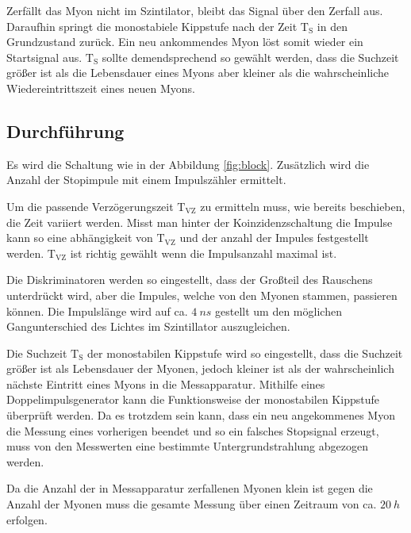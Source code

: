 Zerfällt das Myon nicht im Szintilator, bleibt das Signal über den Zerfall aus.
Daraufhin springt die monostabiele Kippstufe nach der Zeit $\text{T}_{\text{S}}$ in den Grundzustand zurück.
Ein neu ankommendes Myon löst somit wieder ein Startsignal aus.
$\text{T}_{\text{S}}$ sollte demendsprechend so gewählt werden, dass die Suchzeit größer ist als die Lebensdauer eines Myons
aber kleiner als die wahrscheinliche Wiedereintrittszeit eines neuen Myons.

\subsection{Durchführung}
Es wird die Schaltung wie in der Abbildung \ref{fig:block}.
Zusätzlich wird die Anzahl der Stopimpule mit einem Impulszähler ermittelt.

Um die passende Verzögerungszeit $\text{T}_{\text{VZ}}$ zu ermitteln muss, wie bereits beschieben, die Zeit variiert werden.
Misst man hinter der Koinzidenzschaltung die Impulse kann so eine abhängigkeit von $\text{T}_{\text{VZ}}$ und der anzahl der Impules festgestellt werden.
$\text{T}_{\text{VZ}}$ ist richtig gewählt wenn die Impulsanzahl maximal ist.

Die Diskriminatoren werden so eingestellt, dass der Großteil des Rauschens unterdrückt wird, aber die Impules, welche von den Myonen stammen, passieren können.
Die Impulslänge wird auf ca. $\SI{4}{ns}$ gestellt um den möglichen Gangunterschied des Lichtes im Szintillator auszugleichen.

Die Suchzeit $\text{T}_{\text{S}}$ der monostabilen Kippstufe wird so eingestellt, dass die Suchzeit größer ist als Lebensdauer der Myonen, jedoch kleiner ist als
der wahrscheinlich nächste Eintritt eines Myons in die Messapparatur.
Mithilfe eines Doppelimpulsgenerator kann die Funktionsweise der monostabilen Kippstufe überprüft werden.
Da es trotzdem sein kann, dass ein neu angekommenes Myon die Messung eines vorherigen beendet und so ein falsches Stopsignal erzeugt, muss von den Messwerten eine bestimmte Untergrundstrahlung abgezogen werden.

Da die Anzahl der in Messapparatur zerfallenen Myonen klein ist gegen die Anzahl der Myonen muss die gesamte Messung über einen Zeitraum von ca. $\SI{20}{h}$ erfolgen.
